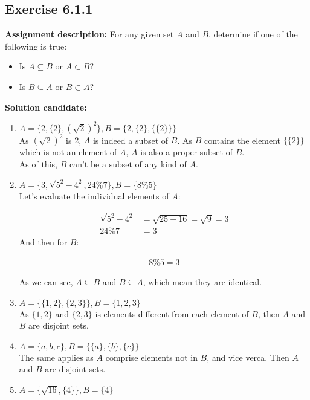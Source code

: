 \documentclass{report}
\newcommand{\mAlign}[1]{\begin{align*}#1\end{align*}}
\newcommand{\AssignmentDescription}{\textbf{Assignment description: }}
\newcommand{\Solution}{\textbf{Solution candidate: }}
\newcommand{\Exercise}[1]{\subsection{Exercise #1}}
\begin{document}
	\Exercise{6.1.1}
	
	\AssignmentDescription
	For any given set $A$ and $B$, determine if one of the following is true:
	\begin{itemize}
		\item Is $A \subseteq B $ or $A \subset B$?
		\item Is $B \subseteq A$ or $B \subset A$?
	\end{itemize}

	\Solution
	
	\begin{enumerate}[label = \textbf{a.}]
		\item $A = \{2,\{2\},(\sqrt{2})^2\}, B = \{2,\{2\},\{\{2\}\}\}$\\
		
		As $(\sqrt{2})^2$ is $2$, $A$ is indeed a subset of $B$. As $B$ contains the element $\{\{2\}\}$ which is not an element of $A$, $A$ is also a proper subset of $B$.\\
		
		As of this, $B$ can't be a subset of any kind of $A$.
		
		\item $A = \{3, \sqrt{5^2 - 4^2}, 24 \%  7\}, B = \{8 \% 5\}$\\
		
		Let's evaluate the individual elements of $A$:
		
		\mAlign{\sqrt{5^2 - 4^2} &= \sqrt{25 - 16} = \sqrt{9} = 3\\
						24\%7 &= 3}
		And then for $B$:
		
		\mAlign{8 \% 5 = 3}
		
		As we can see, $A\subseteq B$ and $B \subseteq A$, which mean they are identical.
		
		\item $A = \{\{1,2\},\{2,3\}\}, B = \{1,2,3\}$\\
		
		As $\{1,2\}$ and $\{2,3\}$ is elements different from each element of $B$, then $A$ and $B$ are disjoint sets.
		
		\item $A = \{a,b,c\}, B = \{\{a\},\{b\},\{c\}\}$\\
		
		The same applies as $A$ comprise elements not in $B$, and vice verca. Then $A$ and $B$ are disjoint sets.
		
		\item  $A = \{\sqrt{16},\{4\}\}, B = \{4\}$\\
		

\end{enumerate}
\end{document}
